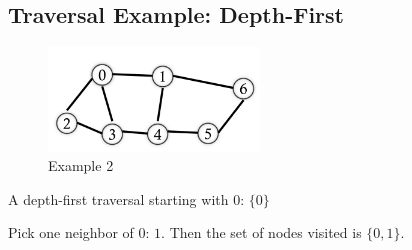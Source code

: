 \documentclass[
  10pt,
  english,
  letterpaper,
,tablecaptionabove
]{scrartcl}
\begin{document}
\hypertarget{traversal-example-depth-first}{%
\subsection{Traversal Example:
Depth-First}\label{traversal-example-depth-first}}

\begin{figure}
\centering
\includegraphics[width=0.5\textwidth,height=\textheight]{images/3.png}
\caption{Example 2}
\end{figure}

A depth-first traversal starting with \(0\): \(\{0\}\)

Pick one neighbor of \(0\): \(1\). Then the set of nodes visited is
\(\{0, 1\}\).
\end{document}
